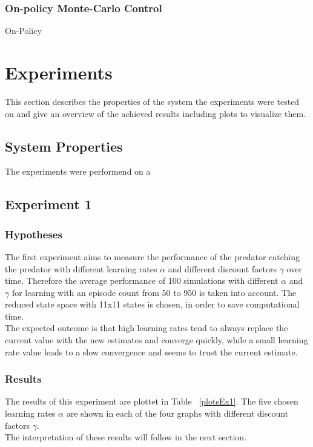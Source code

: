 \documentclass[11pt]{article}
\begin{document}
\subsubsection{On-policy Monte-Carlo Control}
On-Policy 



\section{Experiments}
This section describes the properties of the system the experiments were tested on and give an overview of the achieved results including plots to visualize them.

\subsection{System Properties}
The experiments were performend on a 

\subsection{Experiment 1}

\subsubsection{Hypotheses}
The first experiment aims to measure the performance of the predator catching the predator with different learning rates $\alpha$ and different discount factors $\gamma$ over time. Therefore the average performance of 100 simulations with different $\alpha$ and $\gamma$ for learning with an episode count from 50 to 950 is  taken into account. The reduced state space  with 11x11 states is chosen, in order to save computational time.\\
The expected outcome is that high learning rates tend to always replace the current value with the new estimates and converge quickly, while a small learning rate value leads to a slow convergence and seems to trust the current estimate. ~\cite{dar}

\subsubsection{Results}
The results of this experiment are plottet in Table ~\ref{plotsEx1}. The five chosen learning rates $\alpha$ are shown in each of the four graphs with different discount factors $\gamma$.\\
The interpretation of these results will follow in the next section.
\end{document}
